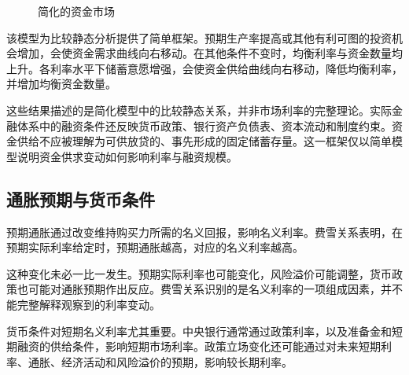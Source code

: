 \begin{figure}[H]
\centering
{}
\caption{简化的资金市场}
\label{fig:ch6-funds-market}
\end{figure}

该模型为比较静态分析提供了简单框架。预期生产率提高或其他有利可图的投资机会增加，会使资金需求曲线向右移动。在其他条件不变时，均衡利率与资金数量均上升。各利率水平下储蓄意愿增强，会使资金供给曲线向右移动，降低均衡利率，并增加均衡资金数量。

这些结果描述的是简化模型中的比较静态关系，并非市场利率的完整理论。实际金融体系中的融资条件还反映货币政策、银行资产负债表、资本流动和制度约束。资金供给不应被理解为可供放贷的、事先形成的固定储蓄存量。这一框架仅以简单模型说明资金供求变动如何影响利率与融资规模。

\subsection{通胀预期与货币条件}

预期通胀通过改变维持购买力所需的名义回报，影响名义利率。费雪关系表明，在预期实际利率给定时，预期通胀越高，对应的名义利率越高。

这种变化未必一比一发生。预期实际利率也可能变化，风险溢价可能调整，货币政策也可能对通胀预期作出反应。费雪关系识别的是名义利率的一项组成因素，并不能完整解释观察到的利率变动。

货币条件对短期名义利率尤其重要。中央银行通常通过政策利率，以及准备金和短期融资的供给条件，影响短期市场利率。政策立场变化还可能通过对未来短期利率、通胀、经济活动和风险溢价的预期，影响较长期利率。

